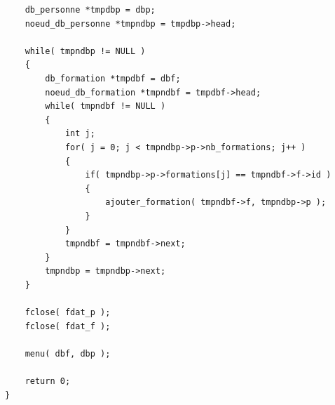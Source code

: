 \documentclass[11pt]{article}
\begin{document}
\begin{lstlisting}
    db_personne *tmpdbp = dbp;
    noeud_db_personne *tmpndbp = tmpdbp->head;

    while( tmpndbp != NULL )
    {
        db_formation *tmpdbf = dbf;
        noeud_db_formation *tmpndbf = tmpdbf->head;
        while( tmpndbf != NULL )
        {
            int j;
            for( j = 0; j < tmpndbp->p->nb_formations; j++ )
            {
                if( tmpndbp->p->formations[j] == tmpndbf->f->id )
                {
                    ajouter_formation( tmpndbf->f, tmpndbp->p );
                }
            }
            tmpndbf = tmpndbf->next;
        }
        tmpndbp = tmpndbp->next;
    }

    fclose( fdat_p );
    fclose( fdat_f );

    menu( dbf, dbp );

    return 0;
}
\end{lstlisting}

\newpage
\printglossary
\end{document}
